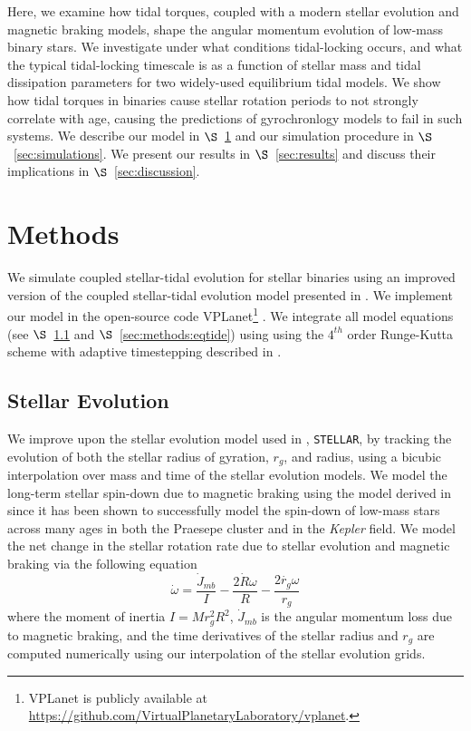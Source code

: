 \documentclass[twocolumn]{aastex61}
\newcommand{\stellar}[0]{\texttt{STELLAR}\xspace}
\newcommand{\kepler}[0]{\textit{Kepler}\xspace}
\begin{document}
Here, we examine how tidal torques, coupled with a modern stellar evolution and magnetic braking models, shape the angular momentum evolution of low-mass binary stars.  We investigate under what conditions tidal-locking occurs, and what the typical tidal-locking timescale is as a function of stellar mass and tidal dissipation parameters for two widely-used equilibrium tidal models.  We show how tidal torques in binaries cause stellar rotation periods to not strongly correlate with age, causing the predictions of gyrochronlogy models to fail in such systems.  We describe our model in $\S$~\ref{sec:methods} and our simulation procedure in $\S$~\ref{sec:simulations}.  We present our results in $\S$~\ref{sec:results} and discuss their implications in $\S$~\ref{sec:discussion}.


\section{Methods} \label{sec:methods}

We simulate coupled stellar-tidal evolution for stellar binaries using an improved version of the coupled stellar-tidal evolution model presented in \citet{Fleming2018}.  We implement our model in the open-source code VPLanet\footnote{VPLanet is publicly available
at \href{https://github.com/VirtualPlanetaryLaboratory/vplanet}{{https://github.com/VirtualPlanetaryLaboratory/vplanet}}.} \citep[][Barnes et al., in prep]{Barnes2016,vplanet2018}.  We integrate all model equations (see $\S$~\ref{sec:methods:stellar} and $\S$~\ref{sec:methods:eqtide}) using using the $4^{th}$ order Runge-Kutta scheme with adaptive timestepping described in \citet{Fleming2018}.  

\subsection{Stellar Evolution} \label{sec:methods:stellar}

We improve upon the stellar evolution model used in \citet{Fleming2018}, \stellar, by tracking the evolution of both the stellar radius of gyration, $r_g$, and radius, using a bicubic interpolation over mass and time of the \citet{Baraffe2015} stellar evolution models. We model the long-term stellar spin-down due to magnetic braking using the model derived in \citet{Matt2015} since it has been shown to successfully model the spin-down of low-mass stars across many ages in both the Praesepe cluster and in the \kepler field. We model the net change in the stellar rotation rate due to stellar evolution and magnetic braking via the following equation 
\begin{equation} \label{eqn:stellar_rot_rate_dt}
\dot{\omega} = \frac{\dot{J}_{mb}}{I} - \frac{2 \dot{R} \omega}{R} - \frac{2 \dot{r_g} \omega}{r_g}
\end{equation}
where the moment of inertia $I = M r_g^2 R^2$, $\dot{J}_{mb}$ is the angular momentum loss due to magnetic braking, and the time derivatives of the stellar radius and $r_g$ are computed numerically using our interpolation of the \citet{Baraffe2015} stellar evolution grids.  
\end{document}
